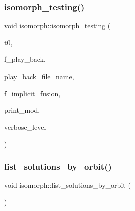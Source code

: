\mbox{\label{classisomorph_ad7945ec94ba0ba16953482edfaa4da6e}} 
\subsubsection{\texorpdfstring{isomorph\+\_\+testing()}{isomorph\_testing()}}
{\footnotesize\ttfamily void isomorph\+::isomorph\+\_\+testing (\begin{DoxyParamCaption}\item[{\mbox{\hyperlink{galois_8h_a09fddde158a3a20bd2dcadb609de11dc}{I\+NT}}}]{t0,  }\item[{\mbox{\hyperlink{galois_8h_a09fddde158a3a20bd2dcadb609de11dc}{I\+NT}}}]{f\+\_\+play\+\_\+back,  }\item[{const \mbox{\hyperlink{galois_8h_ab6cc7b4aeb6ea31aba2b3fbfc83ff5e6}{B\+Y\+TE}} $\ast$}]{play\+\_\+back\+\_\+file\+\_\+name,  }\item[{\mbox{\hyperlink{galois_8h_a09fddde158a3a20bd2dcadb609de11dc}{I\+NT}}}]{f\+\_\+implicit\+\_\+fusion,  }\item[{\mbox{\hyperlink{galois_8h_a09fddde158a3a20bd2dcadb609de11dc}{I\+NT}}}]{print\+\_\+mod,  }\item[{\mbox{\hyperlink{galois_8h_a09fddde158a3a20bd2dcadb609de11dc}{I\+NT}}}]{verbose\+\_\+level }\end{DoxyParamCaption})}

\mbox{\label{classisomorph_adefb1a89c097c284d29f92d5fc58ebfa}} 
\subsubsection{\texorpdfstring{list\+\_\+solutions\+\_\+by\+\_\+orbit()}{list\_solutions\_by\_orbit()}}
{\footnotesize\ttfamily void isomorph\+::list\+\_\+solutions\+\_\+by\+\_\+orbit (\begin{DoxyParamCaption}{ }\end{DoxyParamCaption})}

\mbox{\label{classisomorph_a9c40f343f1a3e5fc177e5121bc809b06}} 
